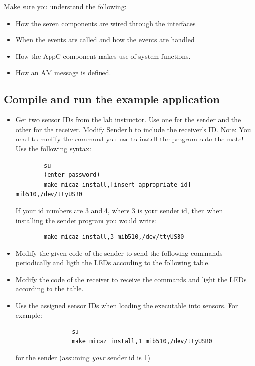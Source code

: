 \documentclass[letterpaper,12pt]{article}
\begin{document}
    Make sure you understand the following:
    \begin{itemize}
        \item How the seven components are wired through the interfaces
        \item When the events are called and how the events are handled
        \item How the AppC component makes use of system functions.
        \item How an AM message is defined.
    \end{itemize}

\subsection*{Compile and run the example application}
    \begin{itemize}
        \item Get two sensor IDs from the lab instructor. Use one for the sender and the other for the receiver. Modify Sender.h to include the receiver's ID.
	      Note: You need to modify the command you use to install the program onto the mote! Use the following syntax:
		\begin{lstlisting}
		su
		(enter password)
		make micaz install,[insert appropriate id] mib510,/dev/ttyUSB0
		\end{lstlisting}
		If your id numbers are 3 and 4, where 3 is your sender id, then when installing the sender program you would write:
		\begin{lstlisting}
		make micaz install,3 mib510,/dev/ttyUSB0
		\end{lstlisting}
        \item Modify the given code of the sender to send the following commands periodically and ligth the LEDs according to the following table.
        \item Modify the code of the receiver to receive the commands and light the LEDs according to the table.
        \item Use the assigned sensor IDs when loading the executable into sensors. For example:
            \begin{lstlisting}
                su
                make micaz install,1 mib510,/dev/ttyUSB0
            \end{lstlisting}
            for the sender (assuming \emph{your} sender id is 1)
    \end{itemize}
\end{document}
